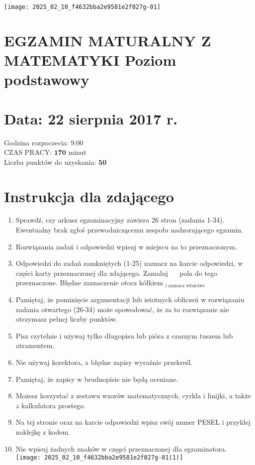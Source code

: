 \documentclass[10pt]{article}
\begin{document}
\begin{center}
\texttt{[image: 2025\_02\_10\_f4632bba2e9581e2f027g-01]}
\end{center}

\section*{EGZAMIN MATURALNY Z MATEMATYKI Poziom podstawowy}
\section*{Data: 22 sierpnia 2017 r.}
Godzina rozpoczecia: 9:00\\
CZAS PRACY: \(\mathbf{1 7 0}\) minut\\
Liczba punktów do uzyskania: \(\mathbf{5 0}\)

\section*{Instrukcja dla zdającego}
\begin{enumerate}
  \item Sprawdź, czy arkusz egzaminacyjny zawiera 26 stron (zadania 1-34). Ewentualny brak zgłoś przewodniczącemu zespołu nadzorującego egzamin.
  \item Rozwiązania zadań i odpowiedzi wpisuj w miejscu na to przeznaczonym.
  \item Odpowiedzi do zadań zamkniętych (1-25) zaznacz na karcie odpowiedzi, w części karty przeznaczonej dla zdającego. Zamaluj \(\quad\) pola do tego przeznaczone. Błędne zaznaczenie otocz kółkiem \({ }_{\text {i zaznacz właściwe }}\)
  \item Pamiętaj, że pominięcie argumentacji lub istotnych obliczeń w rozwiązaniu zadania otwartego (26-34) może spowodować, że za to rozwiązanie nie otrzymasz pełnej liczby punktów.
  \item Pisz czytelnie i używaj tylko długopisu lub pióra z czarnym tuszem lub atramentem.
  \item Nie używaj korektora, a błędne zapisy wyraźnie przekreśl.
  \item Pamiętaj, że zapisy w brudnopisie nie będą oceniane.
  \item Możesz korzystać z zestawu wzorów matematycznych, cyrkla i linijki, a także \(z\) kalkulatora prostego.
  \item Na tej stronie oraz na karcie odpowiedzi wpisz swój numer PESEL i przyklej naklejkę z kodem.
  \item Nie wpisuj żadnych znaków w częşci przeznaczonej dla egzaminatora.\\
\texttt{[image: 2025\_02\_10\_f4632bba2e9581e2f027g-01(1)]}
\end{enumerate}
\end{document}
